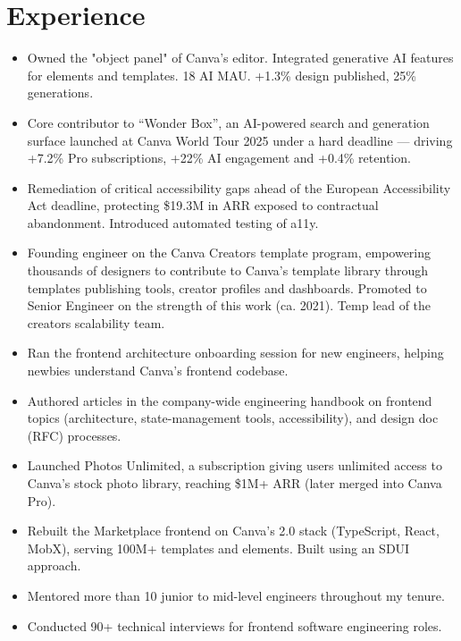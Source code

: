 \documentclass[11pt,a4paper,sans]{moderncv} %
\begin{document}
\maketitle %
\vspace*{-12mm}



\section{Experience}

{\begin{itemize}
    \item Owned the "object panel" of Canva's editor. Integrated generative AI features for elements and templates. 18 AI MAU. +1.3\% design published, 25\% generations.
    \item Core contributor to “Wonder Box”, an AI-powered search and generation surface launched at Canva World Tour 2025 under a hard deadline — driving +7.2\% Pro subscriptions, +22\% AI engagement and +0.4\% retention.
    \item Remediation of critical accessibility gaps ahead of the European Accessibility Act deadline, protecting \$19.3M in ARR exposed to contractual abandonment. Introduced automated testing of a11y.
    \item Founding engineer on the Canva Creators template program, empowering thousands of designers to contribute to Canva's template library through templates publishing tools, creator profiles and dashboards. Promoted to Senior Engineer on the strength of this work (ca. 2021). Temp lead of the creators scalability team.
    \item Ran the frontend architecture onboarding session for new engineers, helping newbies understand Canva’s frontend codebase.
    \item Authored articles in the company-wide engineering handbook on frontend topics (architecture, state-management tools, accessibility), and design doc (RFC) processes.
    \item Launched Photos Unlimited, a subscription giving users unlimited access to Canva's stock photo library, reaching \$1M+ ARR (later merged into Canva Pro).
    \item Rebuilt the Marketplace frontend on Canva's 2.0 stack (TypeScript, React, MobX), serving 100M+ templates and elements. Built using an SDUI approach.
    \item Mentored more than 10 junior to mid-level engineers throughout my tenure.
    \item Conducted 90+ technical interviews for frontend software engineering roles.
\end{itemize}}
\end{document}
